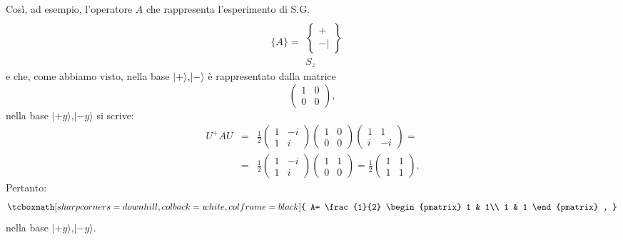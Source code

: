 Così, ad esempio, l'operatore $A$ che rappresenta l'esperimento di S.G.
	\begin{equation}
		\bigg\lbrace A\bigg\rbrace =
		\begin{matrix}
		\
		\\[0.25cm]
		\begin{Bmatrix}
		 +  \\ - |  
		\end{Bmatrix} \\[0.5cm]
		S_z&
		\end{matrix}
	\end{equation}
e che, come abbiamo visto, nella base $| + \rangle $,$| - \rangle $ è rappresentato dalla matrice
	\begin{equation}
		\begin{pmatrix}
		1 & 0\\
		0 & 0
		\end{pmatrix} ,
	\end{equation}
nella base $| +y \rangle $,$| -y \rangle$ si scrive:
	\begin{eqnarray}
		U^+AU &=& \frac{1}{2}
		\begin{pmatrix}
		1 & -i\\
		1 & i
		\end{pmatrix}
		\begin{pmatrix}
		1 & 0\\
		0 & 0
		\end{pmatrix}
		\begin{pmatrix}
		1 & 1\\
		i & -i
		\end{pmatrix}= \nonumber \\
		&=&\frac{1}{2}
		\begin{pmatrix}
		1 & -i\\
		1 & i
		\end{pmatrix}
		\begin{pmatrix}
		1 & 1\\
		0 & 0
		\end{pmatrix}=
		\frac{1}{2}
		\begin{pmatrix}
		1 & 1\\
		1 & 1
		\end{pmatrix} .
		\end{eqnarray}
Pertanto:
	\begin{equation}
		\tcboxmath[sharp corners=downhill, colback=white, colframe=black]{
			A= \frac{1}{2}
			\begin{pmatrix}
			1 & 1\\
			1 & 1
			\end{pmatrix} ,
			}
	\end{equation}
nella base $| +y \rangle $,$| -y \rangle $.\\

